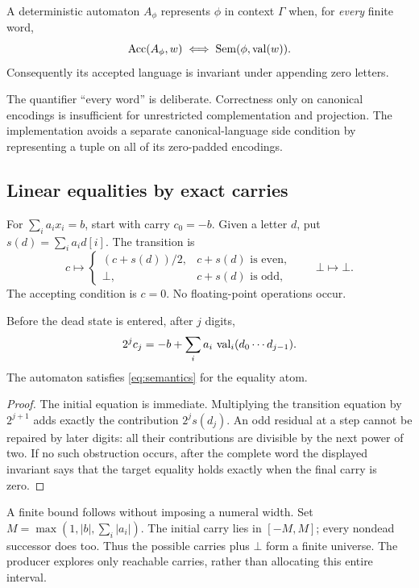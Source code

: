 \begin{definition}
A deterministic automaton \(A_\phi\) represents \(\phi\) in context \(\Gamma\) when, for \emph{every} finite word,
\begin{equation}\label{eq:semantics}
 \operatorname{Acc}(A_\phi,w)\iff\operatorname{Sem}(\phi,\operatorname{val}(w)).
\end{equation}
Consequently its accepted language is invariant under appending zero letters.
\end{definition}

The quantifier ``every word'' is deliberate. Correctness only on canonical encodings is insufficient for unrestricted complementation and projection. The implementation avoids a separate canonical-language side condition by representing a tuple on all of its zero-padded encodings.

\subsection{Linear equalities by exact carries}
For \(\sum_i a_i x_i=b\), start with carry \(c_0=-b\). Given a letter \(d\), put \(s(d)=\sum_i a_i d[i]\). The transition is
\begin{equation}\label{eq:eq-step}
 c\longmapsto
 \begin{cases}(c+s(d))/2,&c+s(d)\text{ is even},\\
 \bot,&c+s(d)\text{ is odd},
 \end{cases}
 \qquad \bot\longmapsto\bot.
\end{equation}
The accepting condition is \(c=0\). No floating-point operations occur.

\begin{lemma}
Before the dead state is entered, after \(j\) digits,
\[
 2^j c_j=-b+\sum_i a_i\,\operatorname{val}_i(d_0\cdots d_{j-1}).
\]
The automaton satisfies \eqref{eq:semantics} for the equality atom.
\end{lemma}
\begin{proof}
The initial equation is immediate. Multiplying the transition equation by \(2^{j+1}\) adds exactly the contribution \(2^j s(d_j)\). An odd residual at a step cannot be repaired by later digits: all their contributions are divisible by the next power of two. If no such obstruction occurs, after the complete word the displayed invariant says that the target equality holds exactly when the final carry is zero.
\end{proof}

A finite bound follows without imposing a numeral width. Set \(M=\max(1,|b|,\sum_i|a_i|)\). The initial carry lies in \([-M,M]\); every nondead successor does too. Thus the possible carries plus \(\bot\) form a finite universe. The producer explores only reachable carries, rather than allocating this entire interval.

